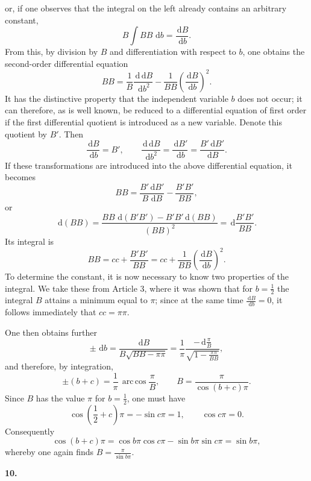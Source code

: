 \documentclass[11pt]{article}
\newcommand{\dd}{\,\mathrm d}
\newcommand{\arccosop}{\operatorname{arc\,cos}}
\newcommand{\art}[1]{\bigskip\begin{center}\large\bfseries #1.\end{center}\nopagebreak}
\begin{document}
or, if one observes that the integral on the left already contains an arbitrary constant,
\begin{equation}
B\int B B\,\dd b=\frac{\dd B}{\dd b}.
\tag{28}
\end{equation}
From this, by division by $B$ and differentiation with respect to $b$, one obtains the second-order differential equation
\[
B B=\frac1B\frac{\dd\dd B}{\dd b^2}
-\frac1{B B}\left(\frac{\dd B}{\dd b}\right)^2.
\]
It has the distinctive property that the independent variable $b$ does not occur; it can therefore, as is well known, be reduced to a differential equation of first order if the first differential quotient is introduced as a new variable. Denote this quotient by $B'$. Then
\[
\frac{\dd B}{\dd b}=B',\qquad
\frac{\dd\dd B}{\dd b^2}=\frac{\dd B'}{\dd b}
=\frac{B'\dd B'}{\dd B}.
\]
If these transformations are introduced into the above differential equation, it becomes
\[
B B=\frac{B'\dd B'}{B\,\dd B}-\frac{B'B'}{B B},
\]
or
\[
\dd(BB)=
\frac{BB\,\dd(B'B')-B'B'\dd(BB)}{(BB)^2}
=\dd\frac{B'B'}{BB}.
\]
Its integral is
\[
BB=cc+\frac{B'B'}{BB}
=cc+\frac1{BB}\left(\frac{\dd B}{\dd b}\right)^2.
\]
To determine the constant, it is now necessary to know two properties of the integral. We take these from Article 3, where it was shown that for $b=\frac12$ the integral $B$ attains a minimum equal to $\pi$; since at the same time $\frac{\dd B}{\dd b}=0$, it follows immediately that $cc=\pi\pi$.

One then obtains further
\[
\pm\,\dd b=
\frac{\dd B}{B\sqrt{BB-\pi\pi}}
=\frac1\pi
  \frac{-\dd\frac{\pi}{B}}
       {\sqrt{1-\frac{\pi\pi}{BB}}},
\]
and therefore, by integration,
\[
\pm(b+c)=\frac1\pi\,\arccosop\frac{\pi}{B},
\qquad
B=\frac{\pi}{\cos(b+c)\pi}.
\]
Since $B$ has the value $\pi$ for $b=\frac12$, one must have
\[
\cos\left(\frac12+c\right)\pi=-\sin c\pi=1,
\qquad \cos c\pi=0.
\]
Consequently
\[
\cos(b+c)\pi=\cos b\pi\cos c\pi-\sin b\pi\sin c\pi=\sin b\pi,
\]
whereby one again finds $B=\frac{\pi}{\sin b\pi}$.

\art{10}
\end{document}
